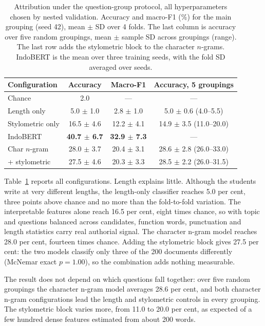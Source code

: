 \documentclass[conference]{IEEEtran}
\begin{document}
\begin{table}[!t]
\caption{Attribution under the question-group protocol, all hyperparameters chosen by nested validation. Accuracy and macro-F1 (\%) for the main grouping (seed 42), mean $\pm$ SD over 4 folds. The last column is accuracy over five random groupings, mean $\pm$ sample SD across groupings (range). The last row adds the stylometric block to the character $n$-grams. IndoBERT is the mean over three training seeds, with the fold SD averaged over seeds.}
\label{tab:main}
\centering
\footnotesize
\setlength{\tabcolsep}{3pt}
\begin{tabular}{@{}lccc@{}}
\hline
Configuration & Accuracy & Macro-F1 & Accuracy, 5 groupings \\
\hline
Chance             & 2.0 & --- & --- \\
Length only        & 5.0 $\pm$ 1.0 & 2.8 $\pm$ 1.0 & 5.0 $\pm$ 0.6 (4.0--5.5) \\
Stylometric only   & 16.5 $\pm$ 4.6 & 12.2 $\pm$ 4.1 & 14.9 $\pm$ 3.5 (11.0--20.0) \\
IndoBERT           & \textbf{40.7 $\pm$ 6.7} & \textbf{32.9 $\pm$ 7.3} & --- \\
Char $n$-gram      & 28.0 $\pm$ 3.7 & 20.4 $\pm$ 3.1 & 28.6 $\pm$ 2.8 (26.0--33.0) \\
\quad + stylometric & 27.5 $\pm$ 4.6 & 20.3 $\pm$ 3.3 & 28.5 $\pm$ 2.2 (26.0--31.5) \\
\hline
\end{tabular}
\end{table}

Table~\ref{tab:main} reports all configurations. Length explains little. Although the students write at very different lengths, the length-only classifier reaches 5.0 per cent, three points above chance and no more than the fold-to-fold variation. The interpretable features alone reach 16.5 per cent, eight times chance, so with topic and questions balanced across candidates, function words, punctuation and length statistics carry real authorial signal. The character n-gram model reaches 28.0 per cent, fourteen times chance. Adding the stylometric block gives 27.5 per cent: the two models classify only three of the 200 documents differently (McNemar exact $p = 1.00$), so the combination adds nothing measurable.

The result does not depend on which questions fall together: over five random groupings the character n-gram model averages 28.6 per cent, and both character n-gram configurations lead the length and stylometric controls in every grouping. The stylometric block varies more, from 11.0 to 20.0 per cent, as expected of a few hundred dense features estimated from about 200 words.
\end{document}
